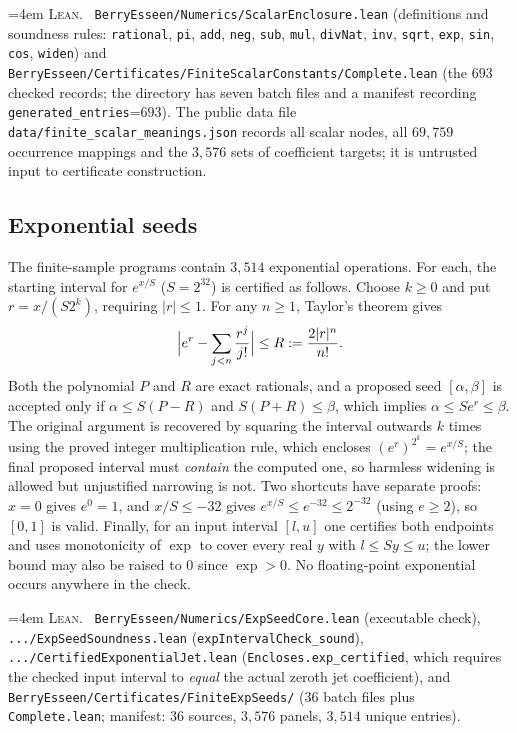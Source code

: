\documentclass[10pt,a4paper]{article}
\theoremstyle{plain}
\theoremstyle{definition}
\newcommand{\lean}[1]{\texttt{#1}}
\newcommand{\file}[1]{\texttt{#1}}
\newenvironment{leanref}%
  {\par\addvspace{3pt}\begingroup\sloppy\emergencystretch=4em
   \noindent\footnotesize\textsc{Lean.}\ \ignorespaces}%
  {\par\endgroup\addvspace{3pt}}
\begin{document}
\begin{leanref}
\file{BerryEsseen/Numerics/ScalarEnclosure.lean} (definitions and soundness
rules: \lean{rational}, \lean{pi}, \lean{add}, \lean{neg}, \lean{sub},
\lean{mul}, \lean{divNat}, \lean{inv}, \lean{sqrt}, \lean{exp}, \lean{sin},
\lean{cos}, \lean{widen}) and
\file{BerryEsseen/Certificates/FiniteScalarConstants/Complete.lean} (the $693$
checked records; the directory has seven batch files and a manifest recording
\lean{generated\_entries}=$693$). The public data file
\file{data/finite\_scalar\_meanings.json} records all scalar nodes, all
$69{,}759$ occurrence mappings and the $3{,}576$ sets of coefficient targets; it
is untrusted input to certificate construction.
\end{leanref}

\subsection{Exponential seeds}
\label{sec:exp-seeds}

The finite-sample programs contain $3{,}514$ exponential operations. For each,
the starting interval for $e^{x/S}$ ($S=2^{32}$) is certified as follows. Choose
$k\ge0$ and put $r=x/(S2^k)$, requiring $|r|\le1$. For any $n\ge1$, Taylor's
theorem gives
\[
  \Bigl|e^r-\sum_{j<n}\frac{r^j}{j!}\Bigr| \le R := \frac{2|r|^n}{n!} .
\]
Both the polynomial $P$ and $R$ are exact rationals, and a proposed seed
$[\alpha,\beta]$ is accepted only if $\alpha\le S(P-R)$ and $S(P+R)\le\beta$,
which implies $\alpha\le S e^r\le\beta$. The original argument is recovered by
squaring the interval outwards $k$ times using the proved integer multiplication
rule, which encloses $(e^r)^{2^k}=e^{x/S}$; the final proposed interval must
\emph{contain} the computed one, so harmless widening is allowed but unjustified
narrowing is not. Two shortcuts have separate proofs: $x=0$ gives $e^0=1$, and
$x/S\le-32$ gives $e^{x/S}\le e^{-32}\le2^{-32}$ (using $e\ge2$), so $[0,1]$ is
valid. Finally, for an input interval $[l,u]$ one certifies both endpoints and
uses monotonicity of $\exp$ to cover every real $y$ with $l\le Sy\le u$; the
lower bound may also be raised to $0$ since $\exp>0$. No floating-point
exponential occurs anywhere in the check.

\begin{leanref}
\file{BerryEsseen/Numerics/ExpSeedCore.lean} (executable check),
\file{.../ExpSeedSoundness.lean} (\lean{expIntervalCheck\_sound}),
\file{.../CertifiedExponentialJet.lean} (\lean{Encloses.exp\_certified},
which requires the checked input interval to \emph{equal} the actual zeroth jet
coefficient), and
\file{BerryEsseen/Certificates/FiniteExpSeeds/} ($36$ batch files plus
\file{Complete.lean}; manifest: $36$ sources, $3{,}576$ panels,
$3{,}514$ unique entries).
\end{leanref}
\end{document}
